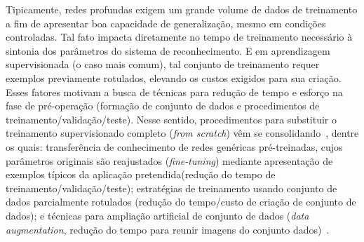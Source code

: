  Tipicamente, redes profundas exigem um grande volume de dados de treinamento a fim de apresentar boa capacidade de generalização, mesmo em condições controladas. Tal fato impacta diretamente no tempo de treinamento necessário à sintonia dos parâmetros do sistema de reconhecimento. E em aprendizagem supervisionada (o caso mais comum), tal conjunto de treinamento requer exemplos previamente rotulados, elevando os custos exigidos para sua criação. Esses fatores motivam a busca de técnicas para redução de tempo e esforço na fase de pré-operação (formação de conjunto de dados e procedimentos de treinamento/validação/teste). Nesse sentido, procedimentos para  substituir o treinamento supervisionado completo (\emph{from scratch}) vêm se consolidando~\parencite{herath-2017}, dentre os quais: transferência de conhecimento de redes genéricas pré-treinadas, cujos parâmetros originais são reajustados  (\emph{fine-tuning}) mediante apresentação de exemplos típicos da aplicação pretendida(redução do tempo de treinamento/validação/teste); estratégias de treinamento usando conjunto de dados parcialmente rotulados (redução do tempo/custo de criação de conjunto de dados); e técnicas para ampliação artificial de conjunto de dados (\emph{data augmentation}, redução do tempo para reunir imagens do conjunto dados)~\parencite{wang-2015}.
%

